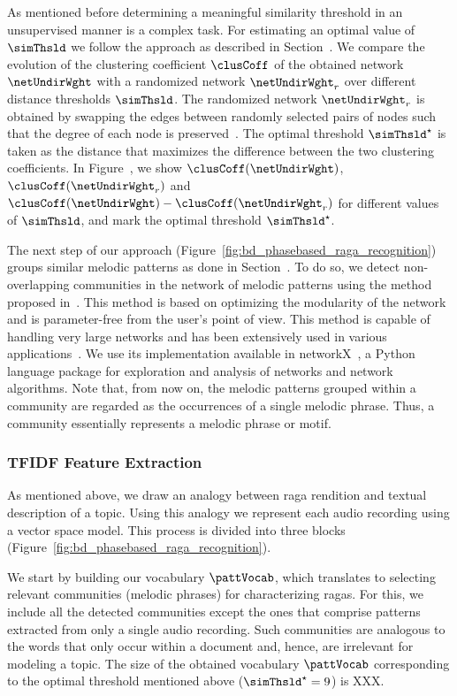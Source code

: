 As mentioned before determining a meaningful similarity threshold in an unsupervised manner is a complex task. For estimating an optimal value of $\simThsld$ we follow the approach as described in Section~. We compare the evolution of the clustering coefficient $\clusCoff$ of the obtained network $\netUndirWght$ with a randomized network $\netUndirWght_r$ over different distance thresholds $\simThsld$. The randomized network $\netUndirWght_r$ is obtained by swapping the edges between randomly selected pairs of nodes such that the degree of each node is preserved~\cite{maslov2002specificity}. The optimal threshold $\simThsld^\star$ is taken as the distance that maximizes the difference between the two clustering coefficients.  In Figure~, we show $\clusCoff(\netUndirWght)$, $\clusCoff(\netUndirWght_r)$ and $\clusCoff(\netUndirWght)-\clusCoff(\netUndirWght_r)$ for different values of $\simThsld$, and mark the optimal threshold $\simThsld^\star$.

The next step of our approach (Figure~\ref{fig:bd_phasebased_raga_recognition}) groups similar melodic patterns as done in Section~. To do so, we detect non-overlapping communities in the network of melodic patterns using the method proposed in~\cite{blondel2008fast}. This method is based on optimizing the modularity of the network and is parameter-free from the user's point of view. This method is capable of handling very large networks and has been extensively used in various applications~\cite{fortunato2010community}. We use its implementation available in networkX~\cite{hagberg-2008-exploring}, a Python language package for exploration and analysis of networks and network algorithms. Note that, from now on, the melodic patterns grouped within a community are regarded as the occurrences of a single melodic phrase. Thus, a community essentially represents a melodic phrase or motif.

\subsubsection{TFIDF Feature Extraction}
\label{sec:vsm_feature_extraction_TFID_computation}

As mentioned above, we draw an analogy between \gls{raga} rendition and textual description of a topic. Using this analogy we represent each audio recording using a vector space model. This process is divided into three blocks (Figure~\ref{fig:bd_phasebased_raga_recognition}).

We start by building our vocabulary $\pattVocab$, which translates to selecting relevant communities (melodic phrases) for characterizing \glspl{raga}. For this, we include all the detected communities except the ones that comprise patterns extracted from only a single audio recording. Such communities are analogous to the words that only occur within a document and, hence, are irrelevant for modeling a topic. The size of the obtained vocabulary $\pattVocab$ corresponding to the optimal threshold mentioned above ($\simThsld^\star=9$) is XXX.

